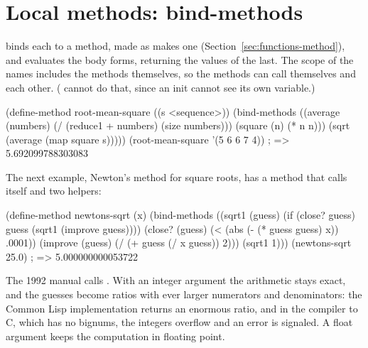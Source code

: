 \section{Local methods: bind-methods}\label{sec:control-bind-methods}

\begin{quote}
\end{quote}

\noindent {} binds each  to a method, made as
 makes one (Section~\ref{sec:functions-method}), and evaluates the
body forms, returning the values of the last. The scope of the names
includes the methods themselves, so the methods can call themselves and each
other. ( cannot do that, since an init cannot see its own
variable.)

\begin{dylan}
(define-method root-mean-square ((s <sequence>))
  (bind-methods ((average (numbers)
                   (/ (reduce1 + numbers) (size numbers)))
                 (square (n) (* n n)))
    (sqrt (average (map square s)))))
(root-mean-square '(5 6 6 7 4))   ; => 5.692099788303083
\end{dylan}

\noindent The next example, Newton's method for square roots, has a method
that calls itself and two helpers:

\begin{dylan}
(define-method newtons-sqrt (x)
  (bind-methods ((sqrt1 (guess)
                   (if (close? guess)
                       guess
                       (sqrt1 (improve guess))))
                 (close? (guess)
                   (< (abs (- (* guess guess) x)) .0001))
                 (improve (guess)
                   (/ (+ guess (/ x guess)) 2)))
    (sqrt1 1)))
(newtons-sqrt 25.0)      ; => 5.000000000053722
\end{dylan}

\noindent The 1992 manual calls . With an integer
argument the arithmetic stays exact, and the guesses become ratios with
ever larger numerators and denominators: the Common Lisp implementation
returns an enormous ratio, and in the compiler to C, which has no bignums,
the integers overflow and an error is signaled. A float argument keeps the
computation in floating point.

